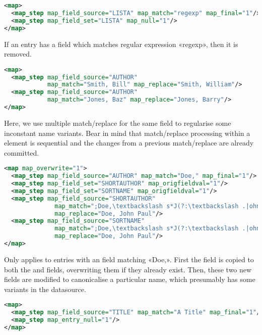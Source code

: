 \documentclass{ltxdockit}
\begin{document}
\begin{lstlisting}[language=xml,escapechar=:,mathescape=true]
<map>
  <map_step map_field_source="LISTA" map_match="regexp" map_final="1"/>
  <map_step map_field_set="LISTA" map_null="1"/>
</map>
\end{lstlisting}

\noindent If an entry has a  field which matches regular
expression «regexp», then it is removed.

\begin{lstlisting}[language=xml,escapechar=:,mathescape=true]
<map>
  <map_step map_field_source="AUTHOR"
            map_match="Smith, Bill" map_replace="Smith, William"/>
  <map_step map_field_source="AUTHOR"
            map_match="Jones, Baz" map_replace="Jones, Barry"/>
</map>
\end{lstlisting}

\noindent Here, we use multiple match/replace for the same field to
regularise some inconstant name variants. Bear in mind that
match/replace processing within a  element is sequential and
the changes from a previous match/replace are already committed.

\begin{lstlisting}[language=xml,escapechar=;,mathescape=true]
<map map_overwrite="1">
  <map_step map_field_source="AUTHOR" map_match="Doe," map_final="1"/>
  <map_step map_field_set="SHORTAUTHOR" map_origfieldval="1"/>
  <map_step map_field_set="SORTNAME" map_origfieldval="1"/>
  <map_step map_field_source="SHORTAUTHOR"
              map_match=";Doe,\textbackslash s*J(?:\textbackslash .|ohn)(?:[-]*)(?:P\textbackslash .|Paul)*;"
              map_replace="Doe, John Paul"/>
  <map_step map_field_source="SORTNAME"
              map_match=";Doe,\textbackslash s*J(?:\textbackslash .|ohn)(?:[-]*)(?:P\textbackslash .|Paul)*;"
              map_replace="Doe, John Paul"/>
</map>
\end{lstlisting}

\noindent Only applies to entries with an  field matching
«Doe,». First the  field is copied to both the
 and  fields, overwriting them if they
already exist. Then, these two new fields are modified to canonicalise a
particular name, which presumably has some variants in the datasource.

\begin{lstlisting}[language=xml,escapechar=;,mathescape=true]
<map>
  <map_step map_field_source="TITLE" map_match="A Title" map_final="1"/>
  <map_step map_entry_null="1"/>
</map>
\end{lstlisting}
\end{document}
